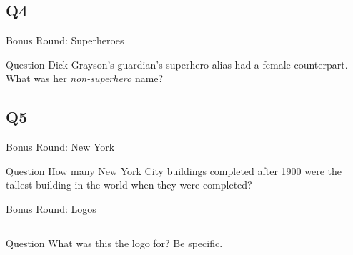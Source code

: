 \documentclass[11pt]{beamer}
\begin{document}
\subsection*{Q4}
\begin{frame}[t]{Bonus Round: Superheroes}
\begin{block}{Question}
Dick Grayson's guardian's superhero alias had a female counterpart. What was her \emph{non-superhero} name?
\end{block}
\end{frame}
\subsection*{Q5}
\begin{frame}[t]{Bonus Round: New York}
\begin{block}{Question}
How many New York City buildings completed after 1900 were the tallest building in the world when they were completed?
\end{block}
\end{frame}
\begin{frame}[t]{Bonus Round: Logos}
\begin{columns}[T,totalwidth=\linewidth]
\begin{column}{0.47\linewidth}
\begin{block}{Question}
What was this the logo for? Be specific.
\end{block}
\end{column}
\begin{column}{0.47\linewidth}
\texttt{[image: \{Images/paris2024bid]}.png}
\end{column}
\end{columns}
\end{frame}
\end{document}

